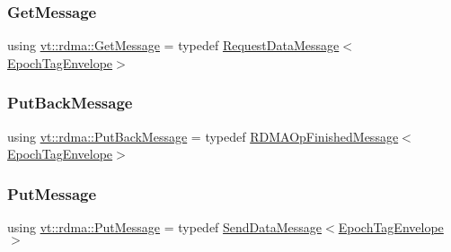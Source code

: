 \mbox{\label{namespacevt_1_1rdma_acce0da4c9ea1233c3f132c1971943653}} 
\subsubsection{\texorpdfstring{Get\+Message}{GetMessage}}
{\footnotesize\ttfamily using \hyperlink{namespacevt_1_1rdma_acce0da4c9ea1233c3f132c1971943653}{vt\+::rdma\+::\+Get\+Message} = typedef \hyperlink{structvt_1_1rdma_1_1_request_data_message}{Request\+Data\+Message}$<$\hyperlink{namespacevt_af23b58014ced6898422213a0e5e6a27a}{Epoch\+Tag\+Envelope}$>$}

\mbox{\label{namespacevt_1_1rdma_a07a52401fe8185d190371b3333dc61ac}} 
\subsubsection{\texorpdfstring{Put\+Back\+Message}{PutBackMessage}}
{\footnotesize\ttfamily using \hyperlink{namespacevt_1_1rdma_a07a52401fe8185d190371b3333dc61ac}{vt\+::rdma\+::\+Put\+Back\+Message} = typedef \hyperlink{structvt_1_1rdma_1_1_r_d_m_a_op_finished_message}{R\+D\+M\+A\+Op\+Finished\+Message}$<$\hyperlink{namespacevt_af23b58014ced6898422213a0e5e6a27a}{Epoch\+Tag\+Envelope}$>$}

\mbox{\label{namespacevt_1_1rdma_ae0a0330c647ec5ac5d508750f4cd4a06}} 
\subsubsection{\texorpdfstring{Put\+Message}{PutMessage}}
{\footnotesize\ttfamily using \hyperlink{namespacevt_1_1rdma_ae0a0330c647ec5ac5d508750f4cd4a06}{vt\+::rdma\+::\+Put\+Message} = typedef \hyperlink{structvt_1_1rdma_1_1_send_data_message}{Send\+Data\+Message}$<$\hyperlink{namespacevt_af23b58014ced6898422213a0e5e6a27a}{Epoch\+Tag\+Envelope}$>$}

\mbox{\label{namespacevt_1_1rdma_a8320f97b4a2866df60d9778486dbcd0f}} 
